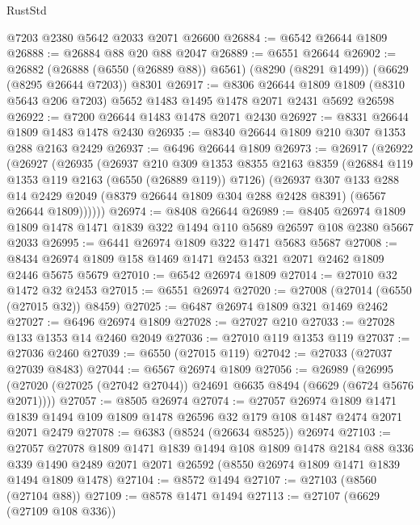 \begin{lexlean}{RustStd}
\begin{coremodule}
    @7203
    @2380
    @5642
    @2033
    @2071
    @26600
@26884 := @6542 @26644 @1809
@26888 := @26884 @88 @20 @88 @2047
@26889 := @6551 @26644
@26902 := @26882
    (@26888 (@6550 (@26889 @88)) @6561)
    (@8290 (@8291 @1499))
    (@6629 (@8295 @26644 @7203))
    @8301
@26917 := @8306
    @26644
    @1809
    @1809
    (@8310 @5643 @206 @7203)
    @5652
    @1483
    @1495
    @1478
    @2071
    @2431
    @5692
    @26598
@26922 := @7200 @26644 @1483 @1478 @2071 @2430
@26927 := @8331 @26644 @1809 @1483 @1478 @2430
@26935 := @8340 @26644 @1809 @210 @307 @1353 @288 @2163 @2429
@26937 := @6496 @26644 @1809
@26973 := @26917
    (@26922
      (@26927
        (@26935
          (@26937
            @210
            @309
            @1353
            @8355
            @2163
            @8359
            (@26884 @119 @1353 @119 @2163 (@6550 (@26889 @119)) @7126)
            (@26937
              @307
              @133
              @288
              @14
              @2429
              @2049
              (@8379 @26644 @1809 @304 @288 @2428 @8391)
              (@6567 @26644 @1809))))))
@26974 := @8408 @26644
@26989 := @8405
    @26974
    @1809
    @1809
    @1478
    @1471
    @1839
    @322
    @1494
    @110
    @5689
    @26597
    @108
    @2380
    @5667
    @2033
@26995 := @6441 @26974 @1809 @322 @1471 @5683 @5687
@27008 := @8434 @26974 @1809 @158 @1469 @1471 @2453 @321 @2071 @2462 @1809 @2446 @5675 @5679
@27010 := @6542 @26974 @1809
@27014 := @27010 @32 @1472 @32 @2453
@27015 := @6551 @26974
@27020 := @27008 (@27014 (@6550 (@27015 @32)) @8459)
@27025 := @6487 @26974 @1809 @321 @1469 @2462
@27027 := @6496 @26974 @1809
@27028 := @27027 @210
@27033 := @27028 @133 @1353 @14 @2460 @2049
@27036 := @27010 @119 @1353 @119
@27037 := @27036 @2460
@27039 := @6550 (@27015 @119)
@27042 := @27033 (@27037 @27039 @8483)
@27044 := @6567 @26974 @1809
@27056 := @26989
    (@26995 (@27020 (@27025 (@27042 @27044)) @24691 @6635 @8494 (@6629 (@6724 @5676 @2071))))
@27057 := @8505 @26974
@27074 := @27057
    @26974
    @1809
    @1471
    @1839
    @1494
    @109
    @1809
    @1478
    @26596
    @32
    @179
    @108
    @1487
    @2474
    @2071
    @2071
    @2479
@27078 := @6383 (@8524 (@26634 @8525)) @26974
@27103 := @27057
    @27078
    @1809
    @1471
    @1839
    @1494
    @108
    @1809
    @1478
    @2184
    @88
    @336
    @339
    @1490
    @2489
    @2071
    @2071
    @26592
    (@8550 @26974 @1809 @1471 @1839 @1494 @1809 @1478)
@27104 := @8572 @1494
@27107 := @27103 (@8560 (@27104 @88))
@27109 := @8578 @1471 @1494
@27113 := @27107 (@6629 (@27109 @108 @336))

\end{coremodule}
\end{lexlean}
